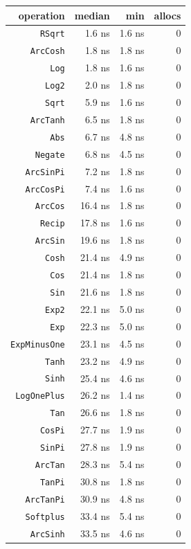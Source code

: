 \begin{table}[h]
\centering
\begin{tabulary}{\linewidth}{R R R R}
\toprule
operation & median & min & allocs \\
\toprule
\texttt{RSqrt} & 1.6 ns & 1.6 ns & 0 \\
\texttt{ArcCosh} & 1.8 ns & 1.8 ns & 0 \\
\texttt{Log} & 1.8 ns & 1.6 ns & 0 \\
\texttt{Log2} & 2.0 ns & 1.8 ns & 0 \\
\texttt{Sqrt} & 5.9 ns & 1.6 ns & 0 \\
\texttt{ArcTanh} & 6.5 ns & 1.8 ns & 0 \\
\texttt{Abs} & 6.7 ns & 4.8 ns & 0 \\
\texttt{Negate} & 6.8 ns & 4.5 ns & 0 \\
\texttt{ArcSinPi} & 7.2 ns & 1.8 ns & 0 \\
\texttt{ArcCosPi} & 7.4 ns & 1.6 ns & 0 \\
\texttt{ArcCos} & 16.4 ns & 1.8 ns & 0 \\
\texttt{Recip} & 17.8 ns & 1.6 ns & 0 \\
\texttt{ArcSin} & 19.6 ns & 1.8 ns & 0 \\
\texttt{Cosh} & 21.4 ns & 4.9 ns & 0 \\
\texttt{Cos} & 21.4 ns & 1.8 ns & 0 \\
\texttt{Sin} & 21.6 ns & 1.8 ns & 0 \\
\texttt{Exp2} & 22.1 ns & 5.0 ns & 0 \\
\texttt{Exp} & 22.3 ns & 5.0 ns & 0 \\
\texttt{ExpMinusOne} & 23.1 ns & 4.5 ns & 0 \\
\texttt{Tanh} & 23.2 ns & 4.9 ns & 0 \\
\texttt{Sinh} & 25.4 ns & 4.6 ns & 0 \\
\texttt{LogOnePlus} & 26.2 ns & 1.4 ns & 0 \\
\texttt{Tan} & 26.6 ns & 1.8 ns & 0 \\
\texttt{CosPi} & 27.7 ns & 1.9 ns & 0 \\
\texttt{SinPi} & 27.8 ns & 1.9 ns & 0 \\
\texttt{ArcTan} & 28.3 ns & 5.4 ns & 0 \\
\texttt{TanPi} & 30.8 ns & 1.8 ns & 0 \\
\texttt{ArcTanPi} & 30.9 ns & 4.8 ns & 0 \\
\texttt{Softplus} & 33.4 ns & 5.4 ns & 0 \\
\texttt{ArcSinh} & 33.5 ns & 4.6 ns & 0 \\
\bottomrule
\end{tabulary}

\end{table}



